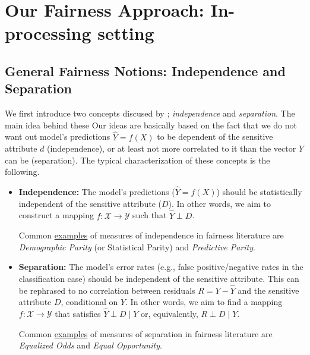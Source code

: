 \documentclass[11pt]{article}
\theoremstyle{plain}
\theoremstyle{definition}
\newcommand{\1}{\mathbf{1}}
\newcommand{\Y}{\mathcal{Y}}
\newcommand{\X}{\mathcal{X}}
\begin{document}

\section{Our Fairness Approach: In-processing setting}




\subsection{General Fairness Notions: Independence and Separation}

We first introduce two concepts discused by \cite{lee2020maximalcorrelationapproachimposing}; \textit{independence} and \textit{separation}. The main idea behind these Our ideas are basically based on the fact that we do not want out model's predictions $\hat{Y}=f(X)$ to be dependent of the sensitive attribute $d$ (independence), or at least not more correlated to it than the vector $Y$ can be (separation). The typical characterization of these concepts is the following. 
\begin{itemize}
    \item \textbf{Independence:} The model's predictions ($\hat{Y}=f(X)$) should be statistically independent of the sensitive attribute ($D$). In other words, we aim to construct a mapping $f:\X \rightarrow \Y$ such that $\hat{Y} \perp D$.
    
    Common \underline{examples} of measures of independence in fairness literature are \textit{Demographic Parity} (or Statistical Parity) and \textit{Predictive Parity}. 
    
    \item \textbf{Separation:} The model's error rates (e.g., false positive/negative rates in the classification case) should be independent of the sensitive attribute. This can be rephrased to no correlation between residuals $R= Y - \hat{Y}$ and the sensitive attribute $D$, conditional on $Y$. In other words, we aim to find a mapping $f:\X \rightarrow \Y$ that satisfies $\hat{Y} \perp D \mid Y$ or, equivalently, $R \perp D \mid Y$. 

    Common \underline{examples} of measures of separation in fairness literature are \textit{Equalized Odds} and \textit{Equal Opportunity}. 
\end{itemize}
\end{document}
